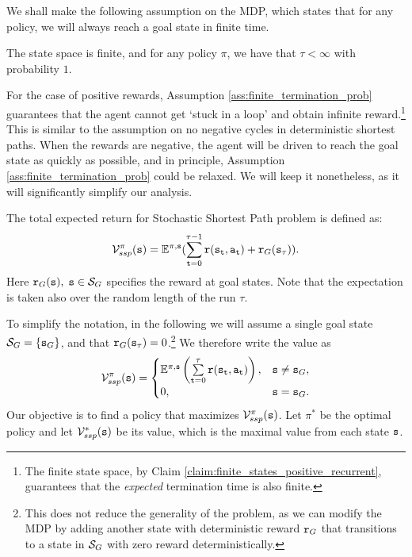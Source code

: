 We shall make the following assumption on the MDP, which states that for any policy, we will always reach a goal state in finite time.
\begin{assumption}\label{ass:finite_termination_prob}
    The state space is finite, and for any policy $\pi$, we have that $\tau < \infty$ with probability $1$.
\end{assumption}

For the case of positive rewards, Assumption \ref{ass:finite_termination_prob} guarantees that the agent cannot get `stuck in a loop' and obtain infinite reward.\footnote{The finite state space, by Claim \ref{claim:finite_states_positive_recurrent}, guarantees that the \textit{expected} termination time is also finite.}
This is similar to the assumption on no negative cycles in deterministic shortest paths. When the rewards are negative, the agent will be driven to reach the goal state as quickly as possible, and in principle, Assumption \ref{ass:finite_termination_prob} could be relaxed. 
We will keep it nonetheless, as it will significantly simplify our analysis. 

The total expected return for Stochastic Shortest Path problem is defined as:
\[\mathcal{V}_{ssp}^\pi ({\tt s}) = {\mathbb{E}^{\pi ,{\tt s}}}(\sum\limits_{{\tt t} = 0}^{\tau  - 1} {{\tt r}({{\tt s}_{\tt t}},{{\tt a}_{\tt t}})}  + {{\tt r}_G}({{\tt s}_\tau })).\]
Here ${{\tt r}_G}({\tt s}),\;{\tt s} \in {\mathcal{S}_G}$ specifies the
reward at goal states. 
Note that the expectation is taken also over the random length of the run $\tau$.

To simplify the notation, in the following we will assume a single goal state $\mathcal{S}_G = \{ {\tt s}_G \}$, and that ${{\tt r}_G}({{\tt s}_\tau }) = 0$.\footnote{This does not reduce the generality of the problem, as we can modify the MDP by adding another state with deterministic reward ${\tt r}_G$ that transitions to a state in $\mathcal{S}_G$ with zero reward deterministically.}  We therefore write the value as 
\begin{equation}\label{eq:ssp_objective}
    \mathcal{V}_{ssp}^\pi ({\tt s}) = \begin{cases}
        {\ensuremath{\mathbb{E}}^{\pi,{\tt s}}}\left(\sum\limits_{{\tt t} = 0}^{\tau} {{\tt r}({{\tt s}_{\tt t}},{{\tt a}_{\tt t}})}\right), & {\tt s} \neq {\tt s}_G ,\\
        0, & {\tt s} = {\tt s}_G.
    \end{cases}
\end{equation}
Our objective is to find a policy that maximizes $\mathcal{V}_{ssp}^\pi ({\tt s})$. Let $\pi^*$ be the optimal policy and let $\mathcal{V}_{ssp}^*({\tt s})$ be its value, which is the maximal value from each state ${\tt s}$.

